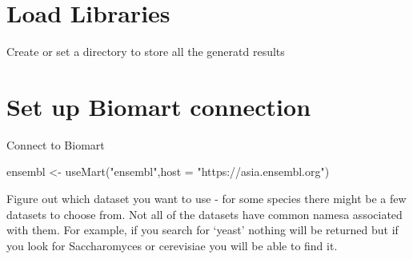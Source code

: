 \documentclass[
]{book}
\newenvironment{Shaded}{\begin{snugshade}}{\end{snugshade}}
\newcommand{\AttributeTok}[1]{\textcolor[rgb]{0.77,0.63,0.00}{#1}}
\newcommand{\CommentTok}[1]{\textcolor[rgb]{0.56,0.35,0.01}{\textit{#1}}}
\newcommand{\ConstantTok}[1]{\textcolor[rgb]{0.00,0.00,0.00}{#1}}
\newcommand{\ControlFlowTok}[1]{\textcolor[rgb]{0.13,0.29,0.53}{\textbf{#1}}}
\newcommand{\FunctionTok}[1]{\textcolor[rgb]{0.00,0.00,0.00}{#1}}
\newcommand{\NormalTok}[1]{#1}
\newcommand{\OtherTok}[1]{\textcolor[rgb]{0.56,0.35,0.01}{#1}}
\newcommand{\SpecialCharTok}[1]{\textcolor[rgb]{0.00,0.00,0.00}{#1}}
\newcommand{\StringTok}[1]{\textcolor[rgb]{0.31,0.60,0.02}{#1}}
\begin{document}
\hypertarget{load-libraries}{%
\section{Load Libraries}\label{load-libraries}}

Create or set a directory to store all the generatd results

\begin{Shaded}
\end{Shaded}

\hypertarget{set-up-biomart-connection}{%
\section{Set up Biomart connection}\label{set-up-biomart-connection}}

Connect to Biomart

\begin{Shaded}
\begin{Highlighting}[]
\NormalTok{ensembl }\OtherTok{\textless{}{-}} \FunctionTok{useMart}\NormalTok{(}\StringTok{"ensembl"}\NormalTok{,}\AttributeTok{host =} \StringTok{"https://asia.ensembl.org"}\NormalTok{)}
\end{Highlighting}
\end{Shaded}

Figure out which dataset you want to use - for some species there might be a few datasets to choose from. Not all of the datasets have common namesa associated with them. For example, if you search for `yeast' nothing will be returned but if you look for Saccharomyces or cerevisiae you will be able to find it.

\begin{Shaded}
\end{Shaded}
\end{document}
